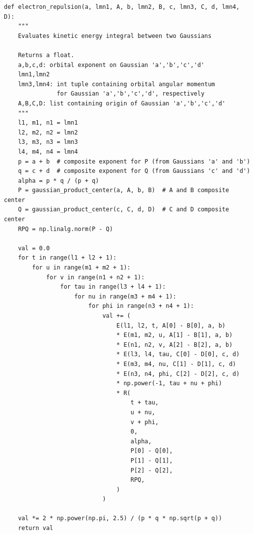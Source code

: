 \begin{lstlisting}[style=MyPython]
def electron_repulsion(a, lmn1, A, b, lmn2, B, c, lmn3, C, d, lmn4, D):
    """
    Evaluates kinetic energy integral between two Gaussians

    Returns a float.
    a,b,c,d: orbital exponent on Gaussian 'a','b','c','d'
    lmn1,lmn2
    lmn3,lmn4: int tuple containing orbital angular momentum
               for Gaussian 'a','b','c','d', respectively
    A,B,C,D: list containing origin of Gaussian 'a','b','c','d'
    """
    l1, m1, n1 = lmn1
    l2, m2, n2 = lmn2
    l3, m3, n3 = lmn3
    l4, m4, n4 = lmn4
    p = a + b  # composite exponent for P (from Gaussians 'a' and 'b')
    q = c + d  # composite exponent for Q (from Gaussians 'c' and 'd')
    alpha = p * q / (p + q)
    P = gaussian_product_center(a, A, b, B)  # A and B composite center
    Q = gaussian_product_center(c, C, d, D)  # C and D composite center
    RPQ = np.linalg.norm(P - Q)

    val = 0.0
    for t in range(l1 + l2 + 1):
        for u in range(m1 + m2 + 1):
            for v in range(n1 + n2 + 1):
                for tau in range(l3 + l4 + 1):
                    for nu in range(m3 + m4 + 1):
                        for phi in range(n3 + n4 + 1):
                            val += (
                                E(l1, l2, t, A[0] - B[0], a, b)
                                * E(m1, m2, u, A[1] - B[1], a, b)
                                * E(n1, n2, v, A[2] - B[2], a, b)
                                * E(l3, l4, tau, C[0] - D[0], c, d)
                                * E(m3, m4, nu, C[1] - D[1], c, d)
                                * E(n3, n4, phi, C[2] - D[2], c, d)
                                * np.power(-1, tau + nu + phi)
                                * R(
                                    t + tau,
                                    u + nu,
                                    v + phi,
                                    0,
                                    alpha,
                                    P[0] - Q[0],
                                    P[1] - Q[1],
                                    P[2] - Q[2],
                                    RPQ,
                                )
                            )

    val *= 2 * np.power(np.pi, 2.5) / (p * q * np.sqrt(p + q))
    return val
\end{lstlisting}

\vspace{5pt}


